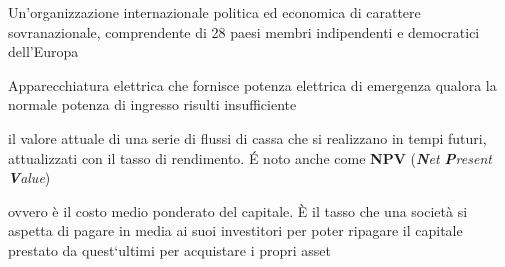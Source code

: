 \begin{acronym}
\begin{multicols}{2}
		   {\newline \small Un'organizzazione internazionale politica ed economica di carattere sovranazionale, comprendente di 28 paesi membri indipendenti e democratici dell'Europa\cite{paesiUE} \par}

		   {\newline \small Apparecchiatura elettrica che fornisce potenza elettrica di emergenza qualora la normale potenza di ingresso risulti insufficiente\par}
		   
		   {\newline \small il valore attuale di una serie di flussi di cassa che si realizzano in tempi futuri, attualizzati con il tasso di rendimento. \'E noto anche come \textbf{NPV} (\textit{\textbf{N}et \textbf{P}resent \textbf{V}alue}) \par}		   

		   {\newline \small ovvero è il costo medio ponderato del capitale. \`E il tasso che una società si aspetta di pagare in media ai suoi investitori per poter ripagare il capitale prestato da quest`ultimi per acquistare i propri asset \par}		
		   
\end{multicols}
\end{acronym}